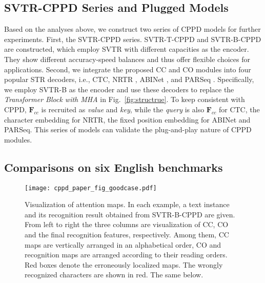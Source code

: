 \documentclass[10pt,journal,compsoc]{IEEEtran}
\begin{document}
\subsection{SVTR-CPPD Series and Plugged Models}
Based on the analyses above, we construct two series of CPPD models for further experiments. First, the SVTR-CPPD series. SVTR-T-CPPD and SVTR-B-CPPD are constructed, which employ SVTR with different capacities as the encoder. They show different accuracy-speed balances and thus offer flexible choices for applications. Second, we integrate the proposed CC and CO modules into four popular STR decoders, i.e., CTC, NRTR \cite{Sheng2019nrtr}, ABINet \cite{fang2021abinet}, and PARSeq \cite{BautistaA22PARSeq}. Specifically, we employ SVTR-B as the encoder and use these decoders to replace the \emph{Transformer Block with MHA} in Fig.~\ref{fig:structrue}. To keep consistent with CPPD, $\mathbf{F}_{cc}$ is recruited as \emph{value} and \emph{key}, while the \emph{query} is also $\mathbf{F}_{cc}$ for CTC, the character embedding for NRTR, the fixed position embedding for ABINet and PARSeq. This series of models can validate the plug-and-play nature of CPPD modules.


\subsection{Comparisons on six English benchmarks}

\begin{figure*}[t]  
\centering  
\texttt{[image: cppd\_paper\_fig\_goodcase.pdf]}  
\caption{Visualization of attention maps. In each example, a text instance and its recognition result obtained from SVTR-B-CPPD are given. From left to right the three columns are visualization of CC, CO and the final recognition features, respectively. Among them, CC maps are vertically arranged in an alphabetical order, CO and recognition maps are arranged according to their reading orders. Red boxes denote the erroneously localized maps. The wrongly recognized characters are shown in red. The same below.}  
\label{fig:vis_2}  
\end{figure*}
\end{document}
